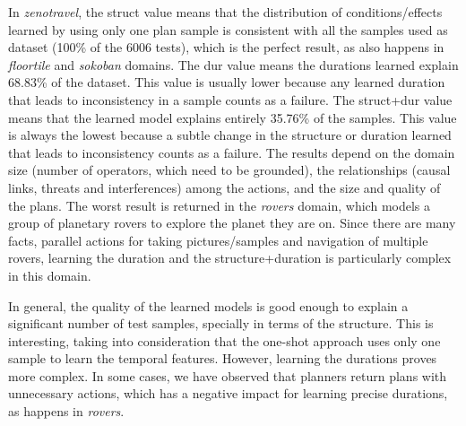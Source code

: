 \documentclass[10pt,journal,compsoc]{IEEEtran}
\begin{document}
In \emph{zenotravel}, the struct value means that the distribution of conditions/effects learned by using only one plan sample is consistent with all the samples used as dataset (100\% of the 6006 tests), which is the perfect result, as also happens in \emph{floortile} and \emph{sokoban} domains.
The dur value means the durations learned explain 68.83\% of the dataset. This value is usually lower because any learned duration that leads to inconsistency in a sample counts as a failure. The struct+dur value means that the learned model explains entirely 35.76\% of the samples. This value is always the lowest because a subtle change in the structure or duration learned that leads to inconsistency counts as a failure. The results depend on the domain size (number of operators, which need to be grounded), the relationships (causal links, threats and interferences) among the actions, and the size and quality of the plans.
The worst result is returned in the \emph{rovers} domain, which models a group of planetary rovers to explore the planet they are on. Since there are many facts, parallel actions for taking pictures/samples and navigation of multiple rovers, learning the duration and the structure+duration is particularly complex in this domain.


In general, the quality of the learned models is good enough to explain a significant number of test samples, specially in terms of the structure. This is interesting, taking into consideration that the one-shot approach uses only one sample to learn the temporal features. However, learning the durations proves more complex. In some cases, we have observed that planners return plans with unnecessary actions, which has a negative impact for learning precise durations, as happens in \emph{rovers}.
\end{document}
